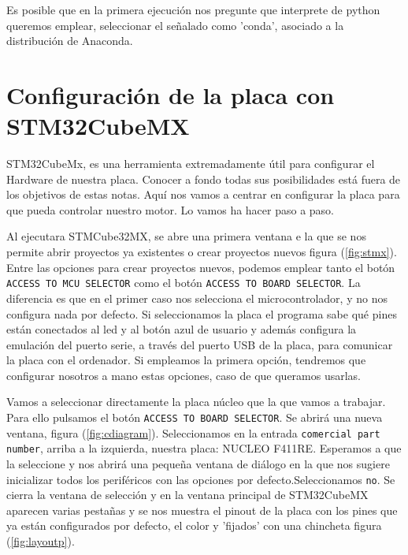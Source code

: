 \documentclass[10pt,a4paper]{report}
\begin{document}
Es posible que en la primera ejecución nos pregunte que interprete de python queremos emplear, seleccionar el señalado como 'conda', asociado a la distribución de Anaconda.

\chapter{Configuración de la placa con STM32CubeMX}
STM32CubeMx, es una herramienta extremadamente útil para configurar el Hardware de nuestra placa. Conocer a fondo todas sus posibilidades está fuera de los objetivos de estas notas. Aquí nos vamos a centrar en configurar la placa para que pueda controlar nuestro motor. Lo vamos ha hacer paso a paso.

Al ejecutara STMCube32MX, se abre una primera ventana e la que se nos permite abrir proyectos ya existentes o crear proyectos nuevos figura (\ref{fig:stmx}). Entre las opciones para crear proyectos nuevos, podemos emplear tanto el botón \texttt{ACCESS TO MCU SELECTOR} como el botón \texttt{ACCESS TO BOARD SELECTOR}. La diferencia es que en el primer caso nos selecciona el microcontrolador, y no nos configura nada por defecto. Si seleccionamos la placa el programa sabe qué pines están conectados al led y al botón azul de usuario y además configura la emulación del puerto serie, a través del puerto USB de la placa, para comunicar la placa con el ordenador. Si empleamos la primera opción, tendremos que configurar nosotros a mano estas opciones, caso de que queramos usarlas.

Vamos a seleccionar directamente la placa núcleo que la que vamos a trabajar. Para ello pulsamos el botón \texttt{ACCESS TO BOARD SELECTOR}. Se abrirá una nueva ventana, figura (\ref{fig:cdiagram}). Seleccionamos en la entrada \texttt{comercial part number}, arriba a la izquierda, nuestra placa: NUCLEO F411RE. Esperamos a que la seleccione y nos abrirá una pequeña ventana de diálogo en la que nos sugiere inicializar todos los periféricos con las opciones por defecto.Seleccionamos \texttt{no}. Se cierra la ventana de selección y en la ventana principal de STM32CubeMX aparecen varias pestañas y se nos muestra el pinout de la placa con los pines que ya están configurados por defecto, el color y 'fijados' con una chincheta figura (\ref{fig:layoutp}).
\end{document}
